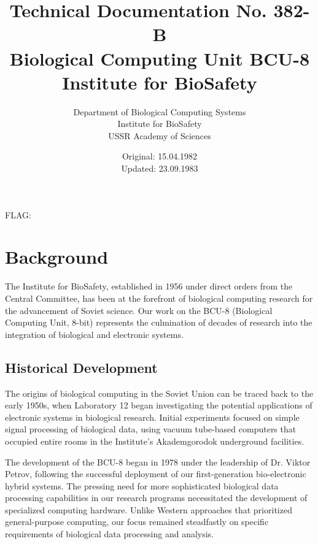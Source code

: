 \documentclass[12pt]{article}
\title{Technical Documentation No. 382-B\\
\large Biological Computing Unit BCU-8\\
Institute for BioSafety}
\author{Department of Biological Computing Systems\\
Institute for BioSafety\\
USSR Academy of Sciences}
\date{Original: 15.04.1982\\Updated: 23.09.1983}
\begin{document}
\maketitle

\vspace*{-2in}  %
{\color{white}\fontsize{1}{1}\selectfont FLAG: \texttt{\expandafter\detokenize\expandafter{\flagcontent}}}

\begin{center}
\end{center}

\tableofcontents
\newpage

\section{Background}
The Institute for BioSafety, established in 1956 under direct orders from the Central Committee, has been at the forefront of biological computing research for the advancement of Soviet science. Our work on the BCU-8 (Biological Computing Unit, 8-bit) represents the culmination of decades of research into the integration of biological and electronic systems.

\subsection{Historical Development}
The origins of biological computing in the Soviet Union can be traced back to the early 1950s, when Laboratory 12 began investigating the potential applications of electronic systems in biological research. Initial experiments focused on simple signal processing of biological data, using vacuum tube-based computers that occupied entire rooms in the Institute's Akademgorodok underground facilities.

The development of the BCU-8 began in 1978 under the leadership of Dr. Viktor Petrov, following the successful deployment of our first-generation bio-electronic hybrid systems. The pressing need for more sophisticated biological data processing capabilities in our research programs necessitated the development of specialized computing hardware. Unlike Western approaches that prioritized general-purpose computing, our focus remained steadfastly on specific requirements of biological data processing and analysis.
\end{document}
